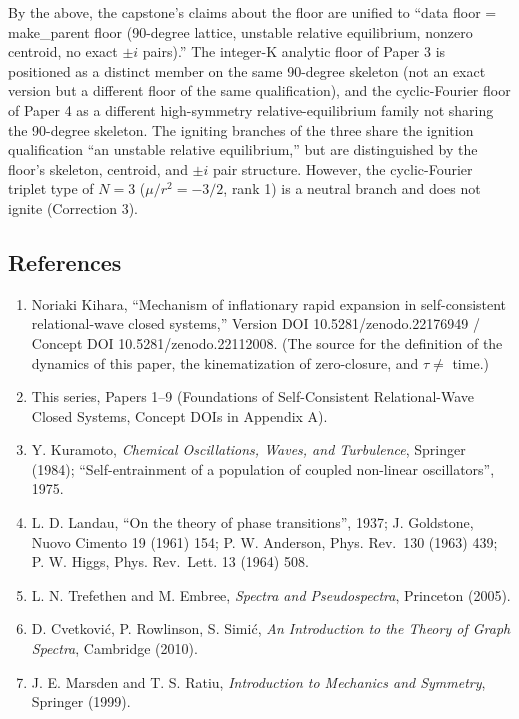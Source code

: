 \documentclass[
  a4paper,
]{ltjsarticle}
\providecommand{\tightlist}{%
  \setlength{\itemsep}{0pt}\setlength{\parskip}{0pt}}
\begin{document}
By the above, the capstone's claims about the floor are unified to
``data floor = make\_parent floor (90-degree lattice, unstable relative
equilibrium, nonzero centroid, no exact \(\pm i\) pairs).'' The
integer-K analytic floor of Paper 3 is positioned as a distinct member
on the same 90-degree skeleton (not an exact version but a different
floor of the same qualification), and the cyclic-Fourier floor of Paper
4 as a different high-symmetry relative-equilibrium family not sharing
the 90-degree skeleton. The igniting branches of the three share the
ignition qualification ``an unstable relative equilibrium,'' but are
distinguished by the floor's skeleton, centroid, and \(\pm i\) pair
structure. However, the cyclic-Fourier triplet type of \(N=3\)
(\(\mu/r^2=-3/2\), rank 1) is a neutral branch and does not ignite
(Correction 3).

\subsection{References}\label{references}

\begin{enumerate}
\def\labelenumi{\arabic{enumi}.}
\tightlist
\item
  Noriaki Kihara, ``Mechanism of inflationary rapid expansion in
  self-consistent relational-wave closed systems,'' Version DOI
  10.5281/zenodo.22176949 / Concept DOI 10.5281/zenodo.22112008. (The
  source for the definition of the dynamics of this paper, the
  kinematization of zero-closure, and \(\tau\neq\) time.)
\item
  This series, Papers 1--9 (Foundations of Self-Consistent
  Relational-Wave Closed Systems, Concept DOIs in Appendix A).
\item
  Y. Kuramoto, \emph{Chemical Oscillations, Waves, and Turbulence},
  Springer (1984); ``Self-entrainment of a population of coupled
  non-linear oscillators'', 1975.
\item
  L. D. Landau, ``On the theory of phase transitions'', 1937; J.
  Goldstone, Nuovo Cimento 19 (1961) 154; P. W. Anderson, Phys. Rev.~130
  (1963) 439; P. W. Higgs, Phys. Rev.~Lett. 13 (1964) 508.
\item
  L. N. Trefethen and M. Embree, \emph{Spectra and Pseudospectra},
  Princeton (2005).
\item
  D. Cvetković, P. Rowlinson, S. Simić, \emph{An Introduction to the
  Theory of Graph Spectra}, Cambridge (2010).
\item
  J. E. Marsden and T. S. Ratiu, \emph{Introduction to Mechanics and
  Symmetry}, Springer (1999).
\end{enumerate}
\end{document}
